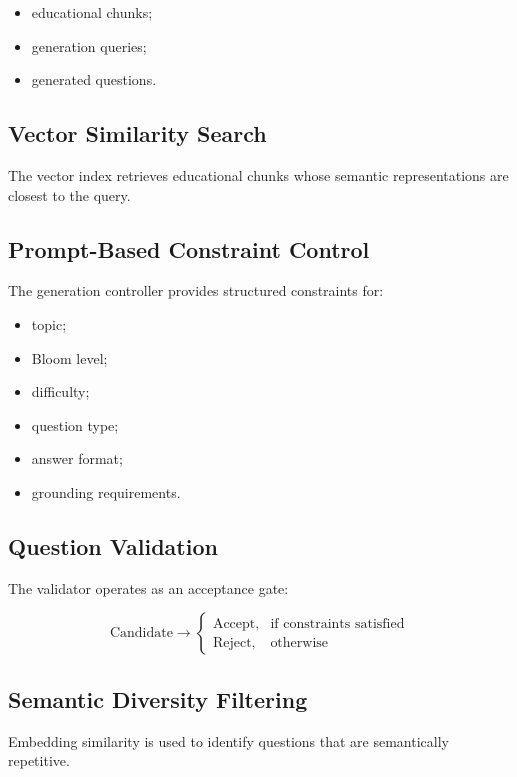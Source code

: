 \documentclass[12pt,a4paper]{report}
\begin{document}
\begin{itemize}
    \item educational chunks;
    \item generation queries;
    \item generated questions.
\end{itemize}

\subsection{Vector Similarity Search}

The vector index retrieves educational chunks whose semantic representations are closest to the query.

\subsection{Prompt-Based Constraint Control}

The generation controller provides structured constraints for:

\begin{itemize}
    \item topic;
    \item Bloom level;
    \item difficulty;
    \item question type;
    \item answer format;
    \item grounding requirements.
\end{itemize}

\subsection{Question Validation}

The validator operates as an acceptance gate:

\[
\text{Candidate}
\rightarrow
\begin{cases}
\text{Accept}, & \text{if constraints satisfied}\\
\text{Reject}, & \text{otherwise}
\end{cases}
\]

\subsection{Semantic Diversity Filtering}

Embedding similarity is used to identify questions that are semantically repetitive.
\end{document}
